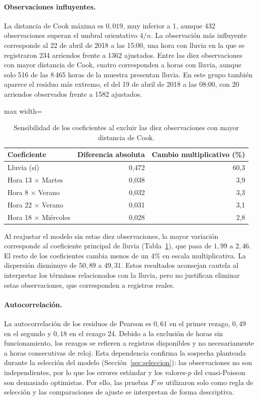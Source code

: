 \documentclass[12pt, a4paper]{article}
\numberwithin{equation}{section}
\begin{document}
\paragraph{Observaciones influyentes.} La distancia de Cook máxima es $0{,}019$, muy inferior a 1, aunque 432 observaciones superan el umbral orientativo $4/n$. La observación más influyente corresponde al 22 de abril de 2018 a las 15:00, una hora con lluvia en la que se registraron 234 arriendos frente a 1362 ajustados. Entre las diez observaciones con mayor distancia de Cook, cuatro corresponden a horas con lluvia, aunque solo 516 de las $8\,465$ horas de la muestra presentan lluvia. En este grupo también aparece el residuo más extremo, el del 19 de abril de 2018 a las 08:00, con 20 arriendos observados frente a 1582 ajustados.

\begin{table}[htbp]
\centering\small
\caption{Sensibilidad de los coeficientes al excluir las diez observaciones con mayor distancia de Cook.}
\label{tab:res_sens}
\begin{adjustbox}{max width=\linewidth}
\begin{tabular}{lrr}\toprule
Coeficiente & Diferencia absoluta & Cambio multiplicativo (\%) \\\midrule
Lluvia (sí) & 0{,}472 & 60{,}3 \\
Hora 13 $\times$ Martes & 0{,}038 & 3{,}9 \\
Hora 8 $\times$ Verano & 0{,}032 & 3{,}3 \\
Hora 22 $\times$ Verano & 0{,}031 & 3{,}1 \\
Hora 18 $\times$ Miércoles & 0{,}028 & 2{,}8 \\\bottomrule
\end{tabular}
\end{adjustbox}
\end{table}

Al reajustar el modelo sin estas diez observaciones, la mayor variación corresponde al coeficiente principal de lluvia (Tabla~\ref{tab:res_sens}), que pasa de $1{,}99$ a $2{,}46$. El resto de los coeficientes cambia menos de un $4\%$ en escala multiplicativa. La dispersión disminuye de $50{,}89$ a $49{,}31$. Estos resultados aconsejan cautela al interpretar los términos relacionados con la lluvia, pero no justifican eliminar estas observaciones, que corresponden a registros reales.

\paragraph{Autocorrelación.} La autocorrelación de los residuos de Pearson es $0{,}61$ en el primer rezago, $0{,}49$ en el segundo y $0{,}18$ en el rezago 24. Debido a la exclusión de horas sin funcionamiento, los rezagos se refieren a registros disponibles y no necesariamente a horas consecutivas de reloj. Esta dependencia confirma la sospecha planteada durante la selección del modelo (Sección~\ref{sec:seleccion}): las observaciones no son independientes, por lo que los errores estándar y los valores-$p$ del cuasi-Poisson son demasiado optimistas. Por ello, las pruebas $F$ se utilizaron solo como regla de selección y las comparaciones de ajuste se interpretan de forma descriptiva.
\end{document}
